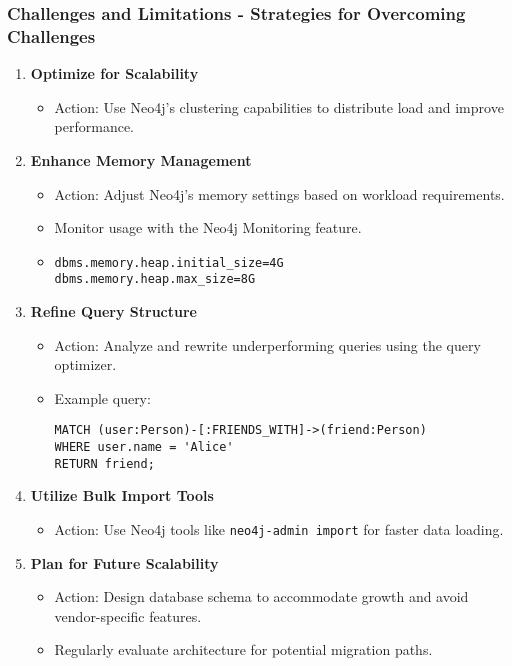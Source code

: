 \documentclass[aspectratio=169]{beamer}
\begin{document}
\begin{frame}[fragile]
    \frametitle{Challenges and Limitations - Strategies for Overcoming Challenges}
    \begin{enumerate}
        \item \textbf{Optimize for Scalability}
            \begin{itemize}
                \item Action: Use Neo4j's clustering capabilities to distribute load and improve performance.
            \end{itemize}

        \item \textbf{Enhance Memory Management}
            \begin{itemize}
                \item Action: Adjust Neo4j’s memory settings based on workload requirements.
                \item Monitor usage with the Neo4j Monitoring feature.
                \item \begin{lstlisting}
dbms.memory.heap.initial_size=4G
dbms.memory.heap.max_size=8G
                \end{lstlisting}
            \end{itemize}
        
        \item \textbf{Refine Query Structure}
            \begin{itemize}
                \item Action: Analyze and rewrite underperforming queries using the query optimizer.
                \item Example query:
                \begin{lstlisting}
MATCH (user:Person)-[:FRIENDS_WITH]->(friend:Person)
WHERE user.name = 'Alice'
RETURN friend;
                \end{lstlisting}
            \end{itemize}

        \item \textbf{Utilize Bulk Import Tools}
            \begin{itemize}
                \item Action: Use Neo4j tools like \texttt{neo4j-admin import} for faster data loading.
            \end{itemize}
        
        \item \textbf{Plan for Future Scalability}
            \begin{itemize}
                \item Action: Design database schema to accommodate growth and avoid vendor-specific features.
                \item Regularly evaluate architecture for potential migration paths.
            \end{itemize}
    \end{enumerate}
\end{frame}
\end{document}
